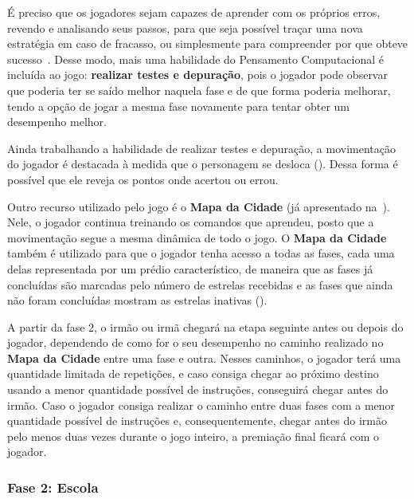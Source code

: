 É preciso que os jogadores sejam capazes de aprender com os próprios erros, revendo e analisando seus passos, para que seja possível traçar uma nova estratégia em caso de fracasso, ou simplesmente para compreender por que obteve sucesso~\cite{paula_jogos_2016}. Desse modo, mais uma habilidade do Pensamento Computacional é incluída ao jogo: \textbf{realizar testes e depuração}, pois o jogador pode observar que poderia ter se saído melhor naquela fase e de que forma poderia melhorar, tendo a opção de jogar a mesma fase novamente para tentar obter um desempenho melhor.

Ainda trabalhando a habilidade de realizar testes e depuração, a movimentação do jogador é destacada à medida que o personagem se desloca (). Dessa forma é possível que ele reveja os pontos onde acertou ou errou.


Outro recurso utilizado pelo jogo é o  \textbf{Mapa da Cidade} (já apresentado na~). Nele, o jogador continua treinando os comandos que aprendeu, posto que a movimentação segue a mesma dinâmica de todo o jogo. O  \textbf{Mapa da Cidade} também é utilizado para que o jogador tenha acesso a todas as fases, cada uma delas representada por um prédio característico, de maneira que as fases já concluídas são marcadas pelo número de estrelas recebidas e as fases que ainda não foram concluídas mostram as estrelas inativas ().


A partir da fase 2, o irmão ou irmã chegará na etapa seguinte antes ou depois do jogador, dependendo de como for o seu desempenho no caminho realizado no \textbf{Mapa da Cidade} entre uma fase e outra. Nesses caminhos, o jogador terá uma quantidade limitada de repetições, e caso consiga chegar ao próximo destino usando a menor quantidade possível de instruções,  conseguirá chegar antes do irmão. Caso o jogador consiga realizar o caminho entre duas fases com a menor quantidade possível de instruções e, consequentemente, chegar antes do irmão pelo menos duas vezes durante o jogo inteiro, a premiação final ficará com o jogador. 

\subsubsection{Fase 2: Escola} \label{sssec:fase_2}

